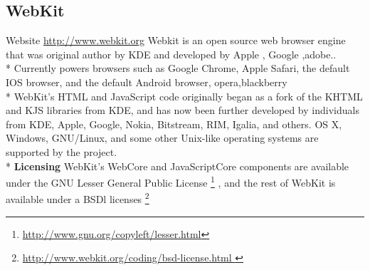 \documentclass[11pt]{article} %
\begin{document}
\subsection{WebKit} %
Website \url {http://www.webkit.org}
Webkit is an open source web browser engine that was original author by KDE and developed  by Apple , Google ,adobe.. \\*
Currently powers browsers such as Google Chrome, Apple Safari, the default IOS browser, and the default Android browser, opera,blackberry \\*
WebKit's HTML and JavaScript code originally began as a fork of the KHTML and KJS libraries from KDE, and has now been further developed by individuals from KDE, Apple, Google, Nokia, Bitstream, RIM, Igalia, and others. OS X, Windows, GNU/Linux, and some other Unix-like operating systems are supported by the project.\\*
{\bf Licensing}
WebKit's WebCore and JavaScriptCore components are available under the GNU Lesser General Public License  \footnote{\url{http://www.gnu.org/copyleft/lesser.html}} , and the rest of WebKit is available under a BSDl licenses \footnote{\url{http://www.webkit.org/coding/bsd-license.html }}

\end{document}
